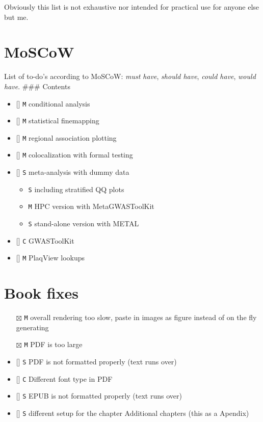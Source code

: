 \documentclass[
]{book}
\providecommand{\tightlist}{%
  \setlength{\itemsep}{0pt}\setlength{\parskip}{0pt}}
\begin{document}
Obviously this list is not exhaustive nor intended for practical use for anyone else but me.

\hypertarget{moscow}{%
\section{MoSCoW}\label{moscow}}

List of to-do's according to MoSCoW: \emph{must have}, \emph{should have}, \emph{could have}, \emph{would have}.
\#\#\# Contents

\begin{itemize}
\tightlist
\item
  {[}{]} \texttt{M} conditional analysis
\item
  {[}{]} \texttt{M} statistical finemapping
\item
  {[}{]} \texttt{M} regional association plotting
\item
  {[}{]} \texttt{M} colocalization with formal testing
\item
  {[}{]} \texttt{S} meta-analysis with dummy data

  \begin{itemize}
  \tightlist
  \item
    \texttt{S} including stratified QQ plots
  \item
    \texttt{M} HPC version with MetaGWASToolKit
  \item
    \texttt{S} stand-alone version with METAL
  \end{itemize}
\item
  {[}{]} \texttt{C} GWASToolKit
\item
  {[}{]} \texttt{M} PlaqView lookups
\end{itemize}

\hypertarget{book-fixes}{%
\section{Book fixes}\label{book-fixes}}

\begin{itemize}
\tightlist
\item[$\boxtimes$]
  \texttt{M} overall rendering too slow, paste in images as figure instead of on the fly generating
\item[$\boxtimes$]
  \texttt{M} PDF is too large
\item
  {[}{]} \texttt{S} PDF is not formatted properly (text runs over)
\item
  {[}{]} \texttt{C} Different font type in PDF
\item
  {[}{]} \texttt{S} EPUB is not formatted properly (text runs over)
\item
  {[}{]} \texttt{S} different setup for the chapter Additional chapters (this as a Apendix)
\end{itemize}
\end{document}
